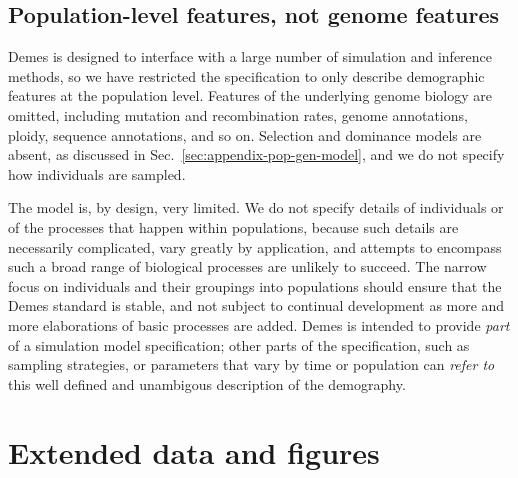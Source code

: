 \documentclass[11pt]{article}
\begin{document}
\subsection{Population-level features, not genome features}
\label{sec:appendix-features}

Demes is designed to interface with a large number of simulation and inference
methods, so we have restricted the specification to only describe
demographic features at the population level.
Features of the underlying genome biology are omitted,
including mutation and recombination rates,
genome annotations, ploidy, sequence annotations, and so on.
Selection and dominance models are absent, as discussed in
Sec.~\ref{sec:appendix-pop-gen-model}, and we do not
specify how individuals are sampled.

The model is, by design, very limited. We do not specify details of
individuals or of the processes that happen within populations,
because such details are necessarily complicated, vary greatly by
application, and attempts to encompass such a broad range of biological
processes are unlikely to succeed.
The narrow focus on individuals and their groupings into populations
should ensure that the Demes standard is stable, and not subject to
continual development as more and more elaborations of basic processes
are added. Demes is intended to provide \emph{part} of a
simulation model specification; other parts of the specification,
such as sampling strategies, or parameters that vary by time
or population can \emph{refer to} this well defined and unambigous
description of the demography.

\section{Extended data and figures}
\label{sec:appendix-figures}
\end{document}
